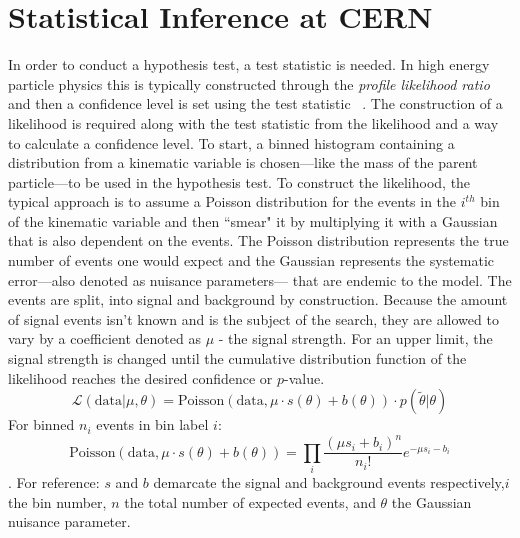 \section{Statistical Inference at CERN}
\label{sec:statinf}
In order to conduct a hypothesis test, a test statistic is needed. In high energy particle physics this is typically constructed through the \textit{profile likelihood ratio} and then a confidence level is set using the test statistic ~\cite{Cowan_2011}.
The construction of a likelihood is required along with the test statistic from the likelihood and a way to calculate a confidence level.
To start, a binned histogram containing a distribution from a kinematic variable is chosen---like the mass of the parent particle---to be used in the hypothesis test. 
To construct the likelihood, the typical approach is to assume a Poisson distribution for the events in the $i^{th}$ bin of the kinematic variable and then ``smear" it by multiplying it with a Gaussian that is also dependent on the events. The Poisson distribution represents the true number of events one would expect and the Gaussian represents the systematic error---also denoted as nuisance parameters--- that are endemic to the model. The events are split, into signal and background by construction. Because the amount of signal events isn't known and is the subject of the search, they are allowed to vary by a coefficient denoted as $\mu$ - the signal strength. For an upper limit, the signal strength is changed until the cumulative distribution function of the likelihood reaches the desired confidence or $p$-value.  
\begin{equation}\mathcal{L}(\text{data}|\mu,\theta) = \text{Poisson}(\text{data},\mu\cdot s(\theta)+b(\theta)) \cdot p(\tilde{\theta}|\theta) \end{equation}
For binned $n_i$ events in bin label $i$:
\begin{equation}
\text{Poisson}(\text{data},\mu\cdot s(\theta)+b(\theta)) = \prod_i \frac{(\mu s_i+b_i)^n}{n_i !}e^{-\mu s_i -b_i}
\end{equation}.
For reference: $s$ and $b$ demarcate the signal and background events respectively,$i$ the bin number, $n$ the total number of expected events, and $\theta$ the Gaussian nuisance parameter.

